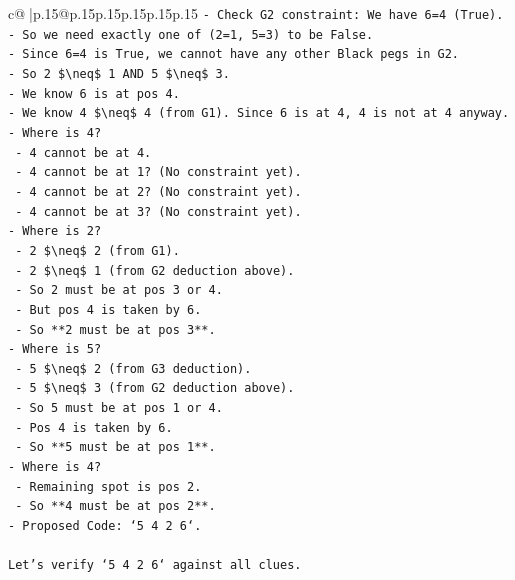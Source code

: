 \documentclass{article}
\begin{document}
{\begin{supertabular}{c@{$\;$}|p{.15\linewidth}@{}p{.15\linewidth}p{.15\linewidth}p{.15\linewidth}p{.15\linewidth}p{.15\linewidth}}
{{{\texttt{{-} Check G2 constraint: We have 6=4 (True).} \\
\texttt{{-} So we need exactly one of (2=1, 5=3) to be False.} \\
\texttt{{-} Since 6=4 is True, we cannot have any other Black pegs in G2.} \\
\texttt{{-} So 2 \$\textbackslash{}neq\$ 1 AND 5 \$\textbackslash{}neq\$ 3.} \\
\texttt{{-} We know 6 is at pos 4.} \\
\texttt{{-} We know 4 \$\textbackslash{}neq\$ 4 (from G1). Since 6 is at 4, 4 is not at 4 anyway.} \\
\texttt{{-} Where is 4?} \\
\texttt{    {-} 4 cannot be at 4.} \\
\texttt{    {-} 4 cannot be at 1? (No constraint yet).} \\
\texttt{    {-} 4 cannot be at 2? (No constraint yet).} \\
\texttt{    {-} 4 cannot be at 3? (No constraint yet).} \\
\texttt{{-} Where is 2?} \\
\texttt{    {-} 2 \$\textbackslash{}neq\$ 2 (from G1).} \\
\texttt{    {-} 2 \$\textbackslash{}neq\$ 1 (from G2 deduction above).} \\
\texttt{    {-} So 2 must be at pos 3 or 4.} \\
\texttt{    {-} But pos 4 is taken by 6.} \\
\texttt{    {-} So **2 must be at pos 3**.} \\
\texttt{{-} Where is 5?} \\
\texttt{    {-} 5 \$\textbackslash{}neq\$ 2 (from G3 deduction).} \\
\texttt{    {-} 5 \$\textbackslash{}neq\$ 3 (from G2 deduction above).} \\
\texttt{    {-} So 5 must be at pos 1 or 4.} \\
\texttt{    {-} Pos 4 is taken by 6.} \\
\texttt{    {-} So **5 must be at pos 1**.} \\
\texttt{{-} Where is 4?} \\
\texttt{    {-} Remaining spot is pos 2.} \\
\texttt{    {-} So **4 must be at pos 2**.} \\
\texttt{{-} Proposed Code: `5 4 2 6`.} \\
\\ 
\texttt{Let's verify `5 4 2 6` against all clues.} \\
}}}
\end{supertabular}}
\end{document}
